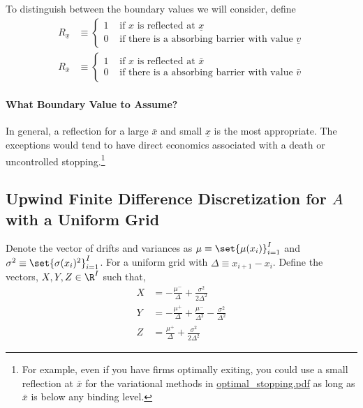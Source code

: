 \documentclass[11pt]{etk-article}
\begin{document}
To distinguish between the boundary values we will consider, define
\begin{align}
	R_{\underline{x}} &\equiv \begin{cases}
		1 & \text{ if $x$ is reflected at $\underline{x}$}\\
		0 & \text{ if there is a absorbing barrier with value $\underline{v}$}
	\end{cases}\label{eq:R-x-min}\\
	R_{\bar{x}} &\equiv \begin{cases}
	1 & \text{ if $x$ is reflected at $\bar{x}$}\\
	0 & \text{ if there is a absorbing barrier with value $\bar{v}$}
\end{cases}\label{eq:R-x-max}
\end{align}	
\paragraph{What Boundary Value to Assume?}
In general, a reflection for a large $\bar{x}$ and small $\underline{x}$ is the most appropriate.  The exceptions would tend to have direct economics associated with a death or uncontrolled stopping.\footnote{For example, even if you have firms optimally exiting, you could use a small reflection at $\bar{x}$ for the variational methods in \url{optimal_stopping.pdf} as long as $\bar{x}$ is below any binding level.}

\subsection{Upwind Finite Difference Discretization for $A$ with a Uniform Grid}
Denote the vector of drifts and variances as $\mu \equiv \set{\mu(x_i)}_{i=1}^I$ and $\sigma^2 \equiv \set{\sigma(x_i)^2}_{i=1}^I$.  For a uniform grid with $\Delta \equiv x_{i+1} - x_i$.  Define the vectors, $X,Y,Z \in \R^I$ such that,
\begin{align}
	X &= - \frac{\mu^{-}}{\Delta}+ \frac{\sigma^{2}}{2 \Delta^2}\label{eq:X} \\
	Y &= - \frac{\mu^{+}}{\Delta} + \frac{\mu^{-}}{\Delta^2}- \frac{\sigma^{2}}{\Delta^2}\label{eq:Y} \\
	Z &= \frac{\mu^{+}}{\Delta} + \frac{\sigma^{2}}{2 \Delta^2}\label{eq:Z}
\end{align}
\end{document}
